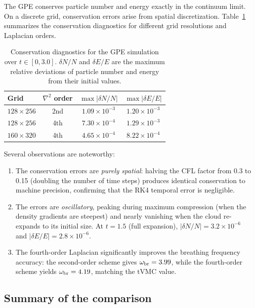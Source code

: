 \documentclass[twocolumn,superscriptaddress,aps,pra,longbibliography]{revtex4-2}
\begin{document}
The GPE conserves particle number and energy exactly in the continuum
limit.  On a discrete grid, conservation errors arise from spatial
discretization.  Table~\ref{tab:conservation} summarizes the conservation
diagnostics for different grid resolutions and Laplacian orders.

\begin{table}[t]
\caption{Conservation diagnostics for the GPE simulation over
$t \in [0, 3.0]$.  $\delta N/N$ and $\delta E/E$ are the maximum relative
deviations of particle number and energy from their initial values.}
\label{tab:conservation}
\begin{ruledtabular}
\begin{tabular}{lccc}
Grid & $\nabla^2$ order & $\max|\delta N/N|$ & $\max|\delta E/E|$ \\
\hline
$128\times256$ & 2nd & $1.09\times10^{-3}$ & $1.20\times10^{-3}$ \\
$128\times256$ & 4th & $7.30\times10^{-4}$ & $1.29\times10^{-3}$ \\
$160\times320$ & 4th & $4.65\times10^{-4}$ & $8.22\times10^{-4}$ \\
\end{tabular}
\end{ruledtabular}
\end{table}

Several observations are noteworthy:
\begin{enumerate}
\item The conservation errors are \emph{purely spatial}:
halving the CFL factor from 0.3 to 0.15 (doubling the number of time
steps) produces identical conservation to machine precision, confirming
that the RK4 temporal error is negligible.
\item The errors are \emph{oscillatory}, peaking during maximum compression
(when the density gradients are steepest) and nearly vanishing when the
cloud re-expands to its initial size.  At $t=1.5$ (full expansion),
$|\delta N/N| = 3.2\times10^{-6}$ and
$|\delta E/E| = 2.8\times10^{-6}$.
\item The fourth-order Laplacian significantly improves the breathing
frequency accuracy: the second-order scheme gives $\omega_{\rm br} = 3.99$,
while the fourth-order scheme yields $\omega_{\rm br} = 4.19$, matching
the tVMC value.
\end{enumerate}

\subsection{Summary of the comparison}
\end{document}
